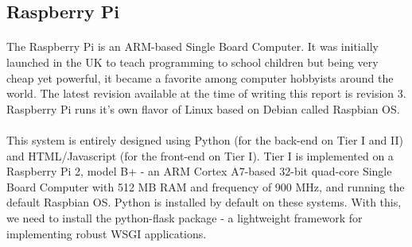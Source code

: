 \begin{comment}
\paragraph{Raspberry Pi}
The Raspberry Pi is an ARM-based Single Board Computer. It was initially launched in the UK to teach programming to school children but being very cheap yet powerful, it became a favorite among computer hobbyists around the world. The latest revision available at the time of writing this report is revision 3. Raspberry Pi runs it's own flavor of Linux based on Debian called Raspbian OS.

\paragraph{SciKit Learn}
SciKit Learn is an open-source machine learning library native to Python that is based on scipy and numpy. SciKit Learn implements a variety of machine learning algorithms in a very efficient way. It also comes with interfaces for many other popular languages.
\end{comment}

\subsection{Raspberry Pi}
\paragraph{}
The Raspberry Pi is an ARM-based Single Board Computer. It was initially launched in the UK to teach programming to school children but being very cheap yet powerful, it became a favorite among computer hobbyists around the world. The latest revision available at the time of writing this report is revision 3. Raspberry Pi runs it's own flavor of Linux based on Debian called Raspbian OS.
\paragraph{}
This system is entirely designed using Python (for the back-end on Tier I and II) and HTML/Javascript (for the front-end on Tier I). Tier I is implemented on a Raspberry Pi 2, model B+ - an ARM Cortex A7-based 32-bit quad-core Single Board Computer with 512 MB RAM and frequency of 900 MHz, and running the default Raspbian OS. Python is installed by default on these systems. With this, we need to install the python-flask package - a lightweight framework for implementing robust WSGI applications.
